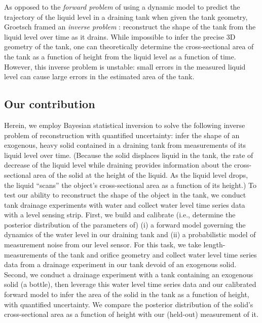 \documentclass[openacc]{rsproca_new}%
\begin{document}
As opposed to the \emph{forward problem} of using a dynamic model to predict the trajectory of the liquid level in a draining tank when given the tank geometry, Groetsch \cite{groetsch1993inverse,groetsch1999inverse} framed an \emph{inverse problem} \cite{groetsch1993inverse,neto2012introduction,tarantola2005inverse}: reconstruct the shape of the tank from the liquid level over time as it drains. 
While impossible to infer the precise 3D geometry of the tank, one can theoretically determine the cross-sectional area of the tank as a function of height from the liquid level as a function of time. However, this inverse problem is unstable: small errors in the measured liquid level can cause large errors in the estimated area of the tank. \cite{groetsch1993inverse}

\subsection{Our contribution}
Herein, we employ Bayesian statistical inversion \cite{calvetti2018inverse,waqar2023tutorial,kaipio2006statistical,dashti2013bayesian} to solve the following inverse problem of reconstruction with quantified uncertainty: infer the shape of an exogenous, heavy solid contained in a draining tank from measurements of its liquid level over time.
(Because the solid displaces liquid in the tank, the rate of decrease of the liquid level while draining provides information about the cross-sectional area of the solid at the height of the liquid.
As the liquid level drops, the liquid ``scans'' the object's cross-sectional area as a function of its height.)
To test our ability to reconstruct the shape of the object in the tank, we conduct tank drainage experiments with water and collect water level time series data with a level sensing strip. First, we build and calibrate (i.e., determine the posterior distribution of the parameters of) (i) a forward model governing the dynamics of the water level in our draining tank and (ii) a probabilistic model of measurement noise from our level sensor.
For this task, we take length-measurements of the tank and orifice geometry and collect water level time series data from a drainage experiment in our tank devoid of an exogenous solid. 
Second, we conduct a drainage experiment with a tank containing an exogenous solid (a bottle), then leverage this water level time series data and our calibrated forward model to infer the area of the solid in the tank as a function of height, with quantified uncertainty.
We compare the posterior distribution of the solid's cross-sectional area as a function of height with our (held-out) measurement of it.
%
\end{document}
